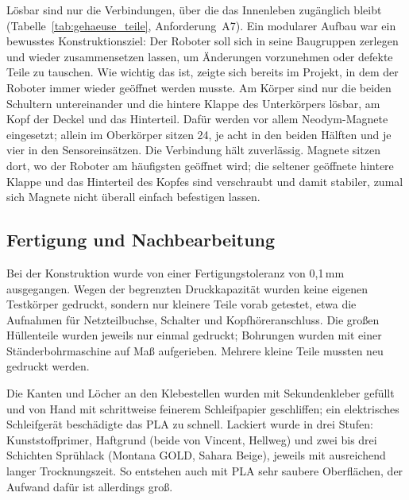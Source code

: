 Lösbar sind nur die Verbindungen, über die das Innenleben zugänglich bleibt
(Tabelle~\ref{tab:gehaeuse_teile}, Anforderung~A7). Ein modularer Aufbau war ein bewusstes
Konstruktionsziel: Der Roboter soll sich in seine Baugruppen zerlegen und wieder zusammensetzen
lassen, um Änderungen vorzunehmen oder defekte Teile zu tauschen. Wie wichtig das ist, zeigte
sich bereits im Projekt, in dem der Roboter immer wieder geöffnet werden musste. Am Körper sind
nur die beiden Schultern untereinander und die hintere Klappe des Unterkörpers lösbar, am Kopf
der Deckel und das Hinterteil. Dafür werden vor allem Neodym-Magnete eingesetzt; allein im
Oberkörper sitzen 24, je acht in den beiden Hälften und je vier in den Sensoreinsätzen. Die
Verbindung hält zuverlässig. Magnete sitzen dort, wo der Roboter am häufigsten geöffnet wird;
die seltener geöffnete hintere Klappe und das Hinterteil des Kopfes sind verschraubt und damit
stabiler, zumal sich Magnete nicht überall einfach befestigen lassen.

\subsection{Fertigung und Nachbearbeitung}
\label{sec:gehaeuse_fertigung}

Bei der Konstruktion wurde von einer Fertigungstoleranz von 0{,}1\,mm ausgegangen. Wegen der
begrenzten Druckkapazität wurden keine eigenen Testkörper gedruckt, sondern nur kleinere Teile
vorab getestet, etwa die Aufnahmen für Netzteilbuchse, Schalter und Kopfhöreranschluss. Die
großen Hüllenteile wurden jeweils nur einmal gedruckt; Bohrungen wurden mit einer
Ständerbohrmaschine auf Maß aufgerieben. Mehrere kleine Teile mussten neu gedruckt werden.

Die Kanten und Löcher an den Klebestellen wurden mit Sekundenkleber gefüllt und von Hand mit
schrittweise feinerem Schleifpapier geschliffen; ein elektrisches Schleifgerät beschädigte das
PLA zu schnell. Lackiert wurde in drei Stufen: Kunststoffprimer, Haftgrund (beide von Vincent,
Hellweg) und zwei bis drei Schichten Sprühlack (Montana GOLD, Sahara Beige), jeweils mit
ausreichend langer Trocknungszeit. So entstehen auch mit PLA sehr saubere Oberflächen, der
Aufwand dafür ist allerdings groß.

